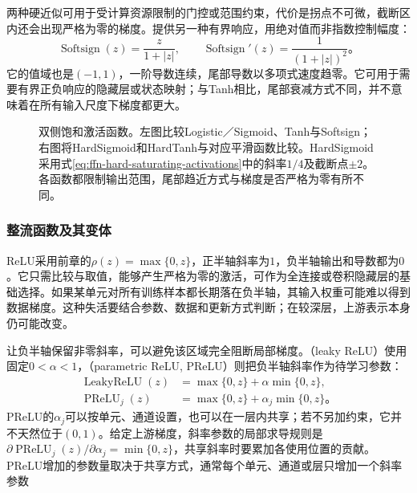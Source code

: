 两种硬近似可用于受计算资源限制的门控或范围约束，代价是拐点不可微，截断区内还会出现严格为零的梯度。提供另一种有界响应，用绝对值而非指数控制幅度：
\begin{equation}
  \operatorname{Softsign}(z)=\frac{z}{1+|z|},
  \qquad
  \operatorname{Softsign}'(z)=\frac{1}{(1+|z|)^2}\text{。}
  \label{eq:ffn-softsign}
\end{equation}
它的值域也是$(-1,1)$，一阶导数连续，尾部导数以多项式速度趋零。它可用于需要有界正负响应的隐藏层或状态映射；与Tanh相比，尾部衰减方式不同，并不意味着在所有输入尺度下梯度都更大。

\begin{figure}[htb]
  \centering
  
  \caption{双侧饱和激活函数。左图比较Logistic／Sigmoid、Tanh与Softsign；右图将HardSigmoid和HardTanh与对应平滑函数比较。HardSigmoid采用式\eqref{eq:ffn-hard-saturating-activations}中的斜率$1/4$及截断点$\pm2$。各函数都限制输出范围，尾部趋近方式与梯度是否严格为零有所不同。}
  \label{fig:ffn-activations}
\end{figure}

\subsubsection{整流函数及其变体}
\label{sec:ffn-activation-rectifiers}

ReLU采用前章的$\rho(z)=\max\{0,z\}$，正半轴斜率为$1$，负半轴输出和导数都为$0$。它只需比较与取值，能够产生严格为零的激活，可作为全连接或卷积隐藏层的基础选择。如果某单元对所有训练样本都长期落在负半轴，其输入权重可能难以得到数据梯度。这种失活要结合参数、数据和更新方式判断；在较深层，上游表示本身仍可能改变。

让负半轴保留非零斜率，可以避免该区域完全阻断局部梯度。（leaky ReLU）使用固定$0<\alpha<1$，（parametric ReLU, PReLU）则把负半轴斜率作为待学习参数：
\begin{equation}
  \begin{aligned}
    \operatorname{LeakyReLU}(z)
      &=\max\{0,z\}+\alpha\min\{0,z\},\\
    \operatorname{PReLU}_j(z)
      &=\max\{0,z\}+\alpha_j\min\{0,z\}\text{。}
  \end{aligned}
  \label{eq:ffn-leaky-prelu}
\end{equation}
PReLU的$\alpha_j$可以按单元、通道设置，也可以在一层内共享；若不另加约束，它并不天然位于$(0,1)$。给定上游梯度，斜率参数的局部求导规则是$\partial\operatorname{PReLU}_j(z)/\partial\alpha_j=\min\{0,z\}$，共享斜率时要累加各使用位置的贡献。PReLU增加的参数量取决于共享方式，通常每个单元、通道或层只增加一个斜率参数

